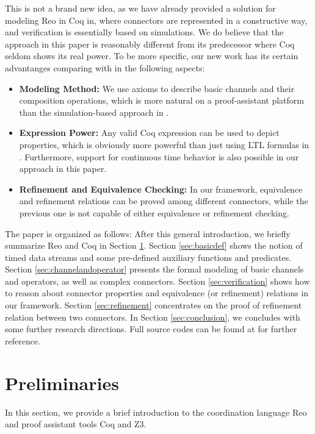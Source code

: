 \documentclass{llncs}
\begin{document}
This is not a brand new idea, as we have already provided a solution for modeling Reo in
Coq in\cite{LS15}, where connectors are represented in a constructive way, and
verification is essentially based on simulations. We do believe that the approach in this paper is reasonably different from
its predecessor where Coq seldom shows its real power. To be more specific, our new work has its certain
advantanges comparing with \cite{LS15} in the following
aspects:
\begin{itemize}
\item {\bf Modeling Method:} We use axioms to describe basic channels and their composition operations, which is more natural on a proof-assistant
platform than the simulation-based approach in \cite{LS15}.
\item {\bf Expression Power:} Any valid Coq expression can be used to depict properties, which is obviously more powerful than just using LTL formulas in
\cite{LS15}. Furthermore, support for continuous time behavior is also
possible in our approach in this paper.
\item {\bf Refinement and Equivalence Checking:} In our framework, equivalence and refinement relations can be proved among different connectors, while the
previous one is not capable of either equivalence or refinement checking.
\end{itemize}


The paper is organized as follows: After this general introduction, we briefly summarize Reo and Coq
in Section \ref{sec:pre}. Section \ref{sec:basicdef} shows the notion of timed data streams and some
pre-defined auxiliary functions and predicates. Section \ref{sec:channelandoperator} presents the
formal modeling of basic channels and operators, as well as complex connectors. Section
\ref{sec:verification} shows how to reason about connector properties and equivalence (or
refinement) relations in our framework. Section \ref{sec:refinement} concentrates on the proof of refinement relation between two connectors.
In Section \ref{sec:conclusion}, we concludes with some further research directions. Full source codes can be found at \cite{reo2coqfile} for further reference.

\section{Preliminaries}\label{sec:pre}

In this section, we provide a brief introduction to the coordination language Reo and proof assistant tools Coq and Z3.
\end{document}
